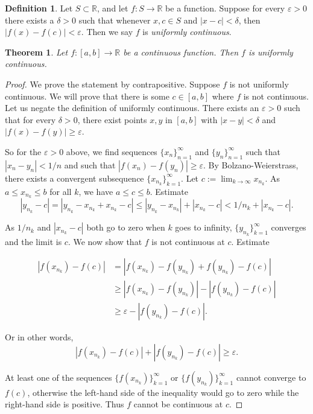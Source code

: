\documentclass{article}
\newtheorem{theorem}{Theorem}[section]
\theoremstyle{definition}
\newtheorem{defi}{Definition}[section]
\begin{document}
\begin{defi}
    Let \( S \subset \mathbb{R} \), and let \( f: S \rightarrow \mathbb{R} \) be a function. Suppose for every \( \varepsilon > 0 \) there exists a \( \delta > 0 \) such that whenever \( x, c \in S \) and \( |x - c| < \delta \), then \( |f(x) - f(c)| < \varepsilon \). Then we say \( f \) is \textit{uniformly continuous}.
\end{defi}

\begin{theorem}
    Let \( f: [a, b] \rightarrow \mathbb{R} \) be a continuous function. Then \( f \) is uniformly continuous.
\end{theorem}

\begin{proof}
    We prove the statement by contrapositive. Suppose \( f \) is not uniformly continuous. We will prove that there is some \( c \in [a, b] \) where \( f \) is not continuous. Let us negate the definition of uniformly continuous. There exists an \( \varepsilon > 0 \) such that for every \( \delta > 0 \), there exist points \( x, y \) in \( [a, b] \) with \( |x - y| < \delta \) and \( |f(x) - f(y)| \geq \varepsilon \).

So for the \( \varepsilon > 0 \) above, we find sequences \( \{x_n\}_{n=1}^{\infty} \) and \( \{y_n\}_{n=1}^{\infty} \) such that \( |x_n - y_n| < 1/n \) and such that \( |f(x_n) - f(y_n)| \geq \varepsilon \). By Bolzano-Weierstrass, there exists a convergent subsequence \( \{x_{n_k}\}_{k=1}^{\infty} \). Let \( c := \lim_{k \rightarrow \infty} x_{n_k} \). As \( a \leq x_{n_k} \leq b \) for all \( k \), we have \( a \leq c \leq b \). Estimate
\[
|y_{n_k} - c| = |y_{n_k} - x_{n_k} + x_{n_k} - c| \leq |y_{n_k} - x_{n_k}| + |x_{n_k} - c| < 1/n_k + |x_{n_k} - c|.
\]

As \( 1/n_k \) and \( |x_{n_k} - c| \) both go to zero when \( k \) goes to infinity, \( \{y_{n_k}\}_{k=1}^{\infty} \) converges and the limit is \( c \). We now show that \( f \) is not continuous at \( c \). Estimate

\begin{align*}
|f(x_{n_k}) - f(c)| &= |f(x_{n_k}) - f(y_{n_k}) + f(y_{n_k}) - f(c)| \\
&\geq |f(x_{n_k}) - f(y_{n_k})| - |f(y_{n_k}) - f(c)| \\
&\geq \varepsilon - |f(y_{n_k}) - f(c)|.
\end{align*}


Or in other words,
\[
|f(x_{n_k}) - f(c)| + |f(y_{n_k}) - f(c)| \geq \varepsilon.
\]

At least one of the sequences \( \{f(x_{n_k})\}_{k=1}^{\infty} \) or \( \{f(y_{n_k})\}_{k=1}^{\infty} \) cannot converge to \( f(c) \), otherwise the left-hand side of the inequality would go to zero while the right-hand side is positive. Thus \( f \) cannot be continuous at \( c \). 
\end{proof}
\end{document}
